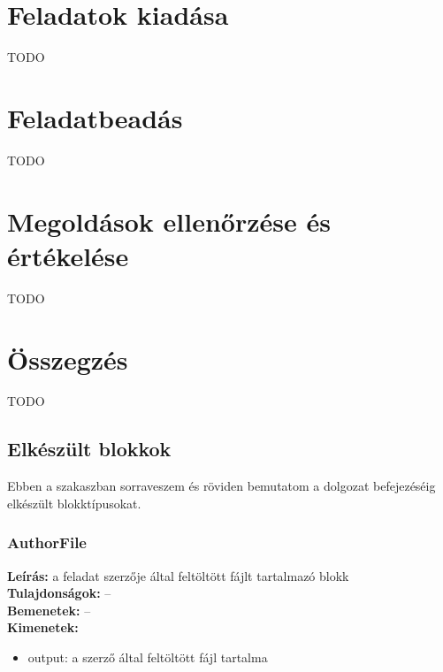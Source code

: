 \section{Feladatok kiadása}
TODO

\section{Feladatbeadás}
TODO

\section{Megoldások ellenőrzése és értékelése}\label{section:submission-evaluation}
TODO


\section{Összegzés}
TODO

\subsection{Elkészült blokkok}
Ebben a szakaszban sorraveszem és röviden bemutatom a dolgozat befejezéséig elkészült blokktípusokat.

\subsubsection{AuthorFile}
\textbf{Leírás:} a feladat szerzője által feltöltött fájlt tartalmazó blokk \\
\textbf{Tulajdonságok:} -- \\
\textbf{Bemenetek:} -- \\
\textbf{Kimenetek:}
\begin{itemize}
    \item output: a szerző által feltöltött fájl tartalma
\end{itemize}
        
